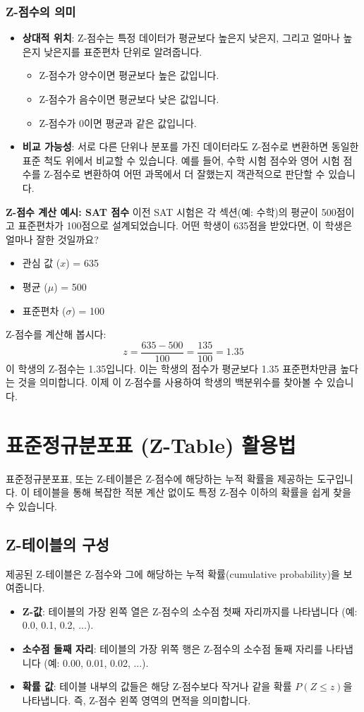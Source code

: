 \documentclass[11pt,a4paper]{book}
\providecommand{\newsection}{\section}
\theoremstyle{definition}
\begin{document}
\subsubsection*{Z-점수의 의미}
\begin{itemize}
    \item \textbf{상대적 위치}: Z-점수는 특정 데이터가 평균보다 높은지 낮은지, 그리고 얼마나 높은지 낮은지를 표준편차 단위로 알려줍니다.
        \begin{itemize}
            \item Z-점수가 양수이면 평균보다 높은 값입니다.
            \item Z-점수가 음수이면 평균보다 낮은 값입니다.
            \item Z-점수가 0이면 평균과 같은 값입니다.
        \end{itemize}
    \item \textbf{비교 가능성}: 서로 다른 단위나 분포를 가진 데이터라도 Z-점수로 변환하면 동일한 표준 척도 위에서 비교할 수 있습니다. 예를 들어, 수학 시험 점수와 영어 시험 점수를 Z-점수로 변환하여 어떤 과목에서 더 잘했는지 객관적으로 판단할 수 있습니다.
\end{itemize}

\begin{examplebox}
\textbf{Z-점수 계산 예시: SAT 점수}
이전 SAT 시험은 각 섹션(예: 수학)의 평균이 500점이고 표준편차가 100점으로 설계되었습니다. 어떤 학생이 635점을 받았다면, 이 학생은 얼마나 잘한 것일까요?

\begin{itemize}
    \item 관심 값 ($x$) = 635
    \item 평균 ($\mu$) = 500
    \item 표준편차 ($\sigma$) = 100
\end{itemize}
Z-점수를 계산해 봅시다:
\[ z = \frac{635 - 500}{100} = \frac{135}{100} = 1.35 \]
이 학생의 Z-점수는 1.35입니다. 이는 학생의 점수가 평균보다 1.35 표준편차만큼 높다는 것을 의미합니다. 이제 이 Z-점수를 사용하여 학생의 백분위수를 찾아볼 수 있습니다.
\end{examplebox}

\newsection*{표준정규분포표 (Z-Table) 활용법}
표준정규분포표, 또는 Z-테이블은 Z-점수에 해당하는 누적 확률을 제공하는 도구입니다. 이 테이블을 통해 복잡한 적분 계산 없이도 특정 Z-점수 이하의 확률을 쉽게 찾을 수 있습니다.

\subsection{Z-테이블의 구성}
제공된 Z-테이블은 Z-점수와 그에 해당하는 누적 확률(cumulative probability)을 보여줍니다.
\begin{itemize}
    \item \textbf{Z-값}: 테이블의 가장 왼쪽 열은 Z-점수의 소수점 첫째 자리까지를 나타냅니다 (예: 0.0, 0.1, 0.2, ...).
    \item \textbf{소수점 둘째 자리}: 테이블의 가장 위쪽 행은 Z-점수의 소수점 둘째 자리를 나타냅니다 (예: 0.00, 0.01, 0.02, ...).
    \item \textbf{확률 값}: 테이블 내부의 값들은 해당 Z-점수보다 작거나 같을 확률 $P(Z \le z)$을 나타냅니다. 즉, Z-점수 왼쪽 영역의 면적을 의미합니다.
\end{itemize}
\end{document}
